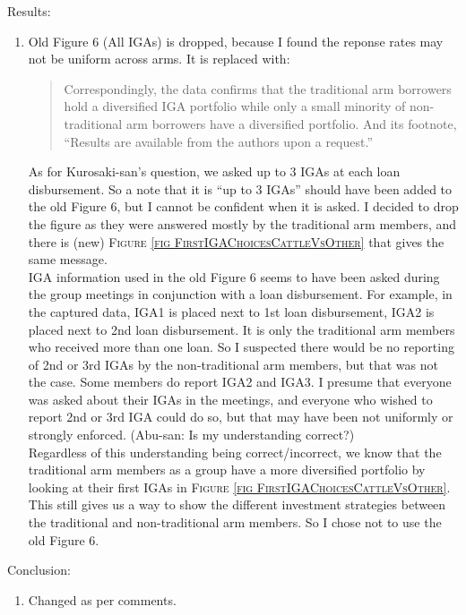 Results: 
\begin{enumerate}
\vspace{1.0ex}\setlength{\itemsep}{1.0ex}\setlength{\baselineskip}{12pt}
\item	Old Figure 6 (All IGAs) is dropped, because I found the reponse rates may not be uniform across arms. It is replaced with: 
	\begin{quotation}
	Correspondingly, the data confirms that the \textsf{traditional} arm borrowers hold a diversified IGA portfolio while only a small minority of non-\textsf{traditional} arm borrowers have a diversified portfolio. And its footnote, ``Results are available from the authors upon a request.'' 
	\end{quotation}
As for Kurosaki-san's question, we asked up to 3 IGAs at each loan disbursement. So a note that it is ``up to 3 IGAs'' should have been added to the old Figure 6, but I cannot be confident when it is asked. I decided to drop the figure as they were answered mostly by the traditional arm members, and there is (new) \textsc{\footnotesize Figure \ref{fig FirstIGAChoicesCattleVsOther}} that gives the same message.\\
\hspace{1em} IGA information used in the old Figure 6 seems to have been asked during the group meetings in conjunction with a loan disbursement. For example, in the captured data, IGA1 is placed next to 1st loan disbursement, IGA2 is placed next to 2nd loan disbursement. It is only the traditional arm members who received more than one loan. So I suspected there would be no reporting of 2nd or 3rd IGAs by the non-traditional arm members, but that was not the case. Some members do report IGA2 and IGA3. I presume that everyone was asked about their IGAs in the meetings, and everyone who wished to report 2nd or 3rd IGA could do so, but that may have been not uniformly or strongly enforced. (Abu-san: Is my understanding correct?)\\
\hspace{1em}Regardless of this understanding being correct/incorrect, we know that the traditional arm members as a group have a more diversified portfolio by looking at their first IGAs in \textsc{\footnotesize Figure \ref{fig FirstIGAChoicesCattleVsOther}}. This still gives us a way to show the different investment strategies between the traditional and non-traditional arm members. So I chose not to use the old Figure 6.
\end{enumerate}
Conclusion:
\begin{enumerate}
\vspace{1.0ex}\setlength{\itemsep}{1.0ex}\setlength{\baselineskip}{12pt}
\item	Changed as per comments.
\end{enumerate}
